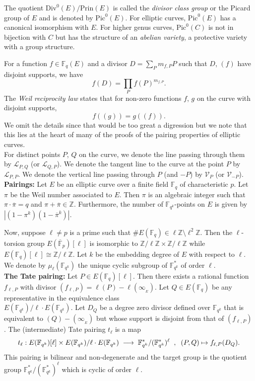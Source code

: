 \documentclass[11pt, lettersize, notitlepage, leqno, footskip=0.6cm]{article}
\newcommand{\bF}{\mathbb F}
\newcommand{\bz}{\mathbb Z}
\newcommand{\bFP}{\ov{\mathbb{F}}_p}
\newcommand{\bFq}{\mathbb{F}_q}
\newcommand{\bFqk}{\mathbb{F}_{q^k}}
\newcommand{\pl}{\prod\limits}
\newcommand{\slim}{\sum\limits}
\newcommand{\lra}{\longrightarrow}
\newcommand{\mc}{\mathcal}
\newcommand{\mr}{\mathrm}
\newcommand{\ov}{\overline}
\newcommand{\vs}{\vspace{-2mm}}
\newcommand{\noin}{\noindent}
\numberwithin{equation}{section}
\begin{document}
The quotient $\mr{Div}^0(E)/\mr{Prin}(E)$ is called the \textit{divisor class group} or the Picard group of $E$ and is denoted by $\mr{Pic}^0(E)$. For elliptic curves,  $\mr{Pic}^0(E)$ has a canonical isomorphism with $E$. For higher genus curves, $\mr{Pic}^0(C)$ is not in bijection with $C$ but has the structure of an \textit{abelian variety}, a protective variety with a group structure.  


For a function $f\in \bFq(E)$ and a divisor $D= \slim_{P} m_{f,P}P$ such that $D$, $(f)$ have disjoint supports, we have \vs $$f(D) = \pl_{P} f(P)^{m_{f,P}} .$$ The \textit{Weil reciprocity law} states that for non-zero functions $f$, $g$ on the curve with disjoint supports, \vs $$f((g)) = g((f)) .$$ We omit the details since that would be too great a digression but we note that this lies at the heart of many of the proofs of the pairing properties of elliptic curves.\\

For distinct points $P$, $Q$ on the curve, we denote the line passing through them by $\mc{L}_{P,Q}$ (or $\mc{L}_{Q, P}$). We denote the tangent line to the curve at the point $P$ by $\mc{L}_{P, P}$. We denote the vertical line passing through $P$ (and $-P$) by $\mc{V}_P$ (or $\mc{V}_{-P}$). \\



\noin \textbf{Pairings:} Let $E$ be an elliptic curve over a finite field $\bFq$  of characteristic $p$. Let $\pi$ be the Weil number associated to $E$. Then $\pi$ is an algebraic integer such that $\pi\cdot \ov{\pi} = q$ and $\pi+\ov{\pi}\in \bz$. Furthermore, the number of $\bFqk$-points on $E$ is given by $|(1-\pi^k)(1-\ov{\pi}^k)|$.


Now, suppose $\ell\neq p$ is a prime such that $\# E(\bFq)\in \ell\bz\setminus \ell^2\bz$. Then the $\ell$-torsion group $E(\bFP)[\ell]$ is isomorphic to $\bz/\ell\bz \times \bz/\ell\bz$ while $E(\bFq)[\ell]\cong \bz/\ell\bz$. Let $k$ be the embedding degree of $E$ with respect to $\ell$. We denote by $\mu_{\ell}(\bF _{q^k})$ the unique cyclic subgroup of $\bF _{q^k}^*$ of order $\ell$.\\

\noin \textbf{The Tate pairing:} Let $P\in E(\bFq)[\ell]$. Then there exists a rational function $f_{\ell,P}$ with divisor $(f_{\ell,P}) = \ell(P) - \ell(\infty_{_E})$. Let $Q\in E(\bFq)$ be any representative in the equivalence class\\ $E(\bF _ {q^k})/\ell \cdot E(\bF _ {q^k})$. Let $D_Q$ be a degree zero divisor defined over $\bF _ {q^k}$ that is equivalent to $(Q)-(\infty_{_E})$ but whose support is disjoint from that of $(f_{\ell,P})$. The (intermediate) Tate pairing $t_{\ell}$ is a map \vs $$t_{\ell}: E(\bF _ {q^k})[\ell]\times E(\bF _ {q^k})/\ell \cdot E(\bF _ {q^k})\;\lra\; \bF _ {q^k}^*/(\bF _ {q^k}^*)^{\ell}\;\;,\;\;(P,Q)\mapsto f_{\ell,P}(D_Q) \vs .$$ This pairing is bilinear and non-degenerate and the target group is the quotient group $\bF _ {q^k}^*/(\bF _ {q^k}^*)^{\ell}$ which is cyclic of order $\ell$. 
\end{document}
